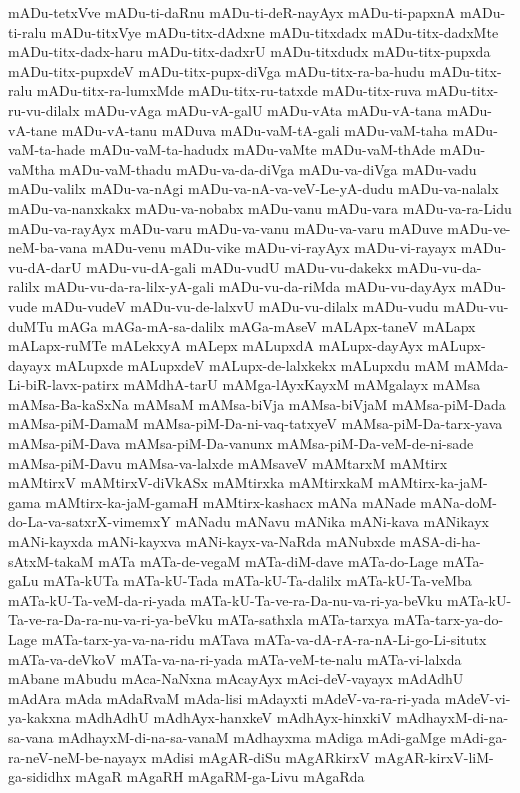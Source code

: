 {mADu-tetxVve
mADu-ti-daRnu
mADu-ti-deR-nayAyx
mADu-ti-papxnA
mADu-ti-ralu
mADu-titxVye
mADu-titx-dAdxne
mADu-titxdadx
mADu-titx-dadxMte
mADu-titx-dadx-haru
mADu-titx-dadxrU
mADu-titxdudx
mADu-titx-pupxda
mADu-titx-pupxdeV
mADu-titx-pupx-diVga
mADu-titx-ra-ba-hudu
mADu-titx-ralu
mADu-titx-ra-lumxMde
mADu-titx-ru-tatxde
mADu-titx-ruva
mADu-titx-ru-vu-dilalx
mADu-vAga
mADu-vA-galU
mADu-vAta
mADu-vA-tana
mADu-vA-tane
mADu-vA-tanu
mADuva
mADu-vaM-tA-gali
mADu-vaM-taha
mADu-vaM-ta-hade
mADu-vaM-ta-hadudx
mADu-vaMte
mADu-vaM-thAde
mADu-vaMtha
mADu-vaM-thadu
mADu-va-da-diVga
mADu-va-diVga
mADu-vadu
mADu-valilx
mADu-va-nAgi
mADu-va-nA-va-veV-Le-yA-dudu
mADu-va-nalalx
mADu-va-nanxkakx
mADu-va-nobabx
mADu-vanu
mADu-vara
mADu-va-ra-Lidu
mADu-va-rayAyx
mADu-varu
mADu-va-vanu
mADu-va-varu
mADuve
mADu-ve-neM-ba-vana
mADu-venu
mADu-vike
mADu-vi-rayAyx
mADu-vi-rayayx
mADu-vu-dA-darU
mADu-vu-dA-gali
mADu-vudU
mADu-vu-dakekx
mADu-vu-da-ralilx
mADu-vu-da-ra-lilx-yA-gali
mADu-vu-da-riMda
mADu-vu-dayAyx
mADu-vude
mADu-vudeV
mADu-vu-de-lalxvU
mADu-vu-dilalx
mADu-vudu
mADu-vu-duMTu
mAGa
mAGa-mA-sa-dalilx
mAGa-mAseV
mALApx-taneV
mALapx
mALapx-ruMTe
mALekxyA
mALepx
mALupxdA
mALupx-dayAyx
mALupx-dayayx
mALupxde
mALupxdeV
mALupx-de-lalxkekx
mALupxdu
mAM
mAMda-Li-biR-lavx-patirx
mAMdhA-tarU
mAMga-lAyxKayxM
mAMgalayx
mAMsa
mAMsa-Ba-kaSxNa
mAMsaM
mAMsa-biVja
mAMsa-biVjaM
mAMsa-piM-Dada
mAMsa-piM-DamaM
mAMsa-piM-Da-ni-vaq-tatxyeV
mAMsa-piM-Da-tarx-yava
mAMsa-piM-Dava
mAMsa-piM-Da-vanunx
mAMsa-piM-Da-veM-de-ni-sade
mAMsa-piM-Davu
mAMsa-va-lalxde
mAMsaveV
mAMtarxM
mAMtirx
mAMtirxV
mAMtirxV-diVkASx
mAMtirxka
mAMtirxkaM
mAMtirx-ka-jaM-gama
mAMtirx-ka-jaM-gamaH
mAMtirx-kashacx
mANa
mANade
mANa-doM-do-La-va-satxrX-vimemxY
mANadu
mANavu
mANika
mANi-kava
mANikayx
mANi-kayxda
mANi-kayxva
mANi-kayx-va-NaRda
mANubxde
mASA-di-ha-sAtxM-takaM
mATa
mATa-de-vegaM
mATa-diM-dave
mATa-do-Lage
mATa-gaLu
mATa-kUTa
mATa-kU-Tada
mATa-kU-Ta-dalilx
mATa-kU-Ta-veMba
mATa-kU-Ta-veM-da-ri-yada
mATa-kU-Ta-ve-ra-Da-nu-va-ri-ya-beVku
mATa-kU-Ta-ve-ra-Da-ra-nu-va-ri-ya-beVku
mATa-sathxla
mATa-tarxya
mATa-tarx-ya-do-Lage
mATa-tarx-ya-va-na-ridu
mATava
mATa-va-dA-rA-ra-nA-Li-go-Li-situtx
mATa-va-deVkoV
mATa-va-na-ri-yada
mATa-veM-te-nalu
mATa-vi-lalxda
mAbane
mAbudu
mAca-NaNxna
mAcayAyx
mAci-deV-vayayx
mAdAdhU
mAdAra
mAda
mAdaRvaM
mAda-lisi
mAdayxti
mAdeV-va-ra-ri-yada
mAdeV-vi-ya-kakxna
mAdhAdhU
mAdhAyx-hanxkeV
mAdhAyx-hinxkiV
mAdhayxM-di-na-sa-vana
mAdhayxM-di-na-sa-vanaM
mAdhayxma
mAdiga
mAdi-gaMge
mAdi-ga-ra-neV-neM-be-nayayx
mAdisi
mAgAR-diSu
mAgARkirxV
mAgAR-kirxV-liM-ga-sididhx
mAgaR
mAgaRH
mAgaRM-ga-Livu
mAgaRda
}
